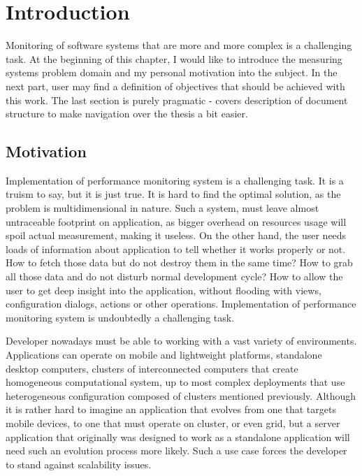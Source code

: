 %
\chapter{Introduction}
\label{cha:intro}


\parbox{0.8\textwidth}{

{\small
Monitoring of software systems that are more and more complex is a challenging task. At the beginning of this chapter, I would like to introduce the measuring systems problem domain and my personal motivation into the subject. In the next part, user may find a definition of objectives that should be achieved with this work. The last section is purely pragmatic - covers description of document structure to make navigation over the thesis a bit easier.
}
}

\section{Motivation}
\label{ch1:Motivation}

Implementation of performance monitoring system is a challenging task. It is a truism to say, but it is just true. It is hard to find the optimal solution, as the problem is multidimensional in nature. Such a system, must leave almost untraceable footprint on application, as bigger overhead on resources usage will spoil actual measurement, making it useless. On the other hand, the user needs loads of information about application to tell whether it works properly or not. How to fetch those data but do not destroy them in the same time? How to grab all those data and do not disturb normal development cycle? How to allow the user to get deep insight into the application, without flooding with views, configuration dialogs, actions or other operations. Implementation of performance monitoring system is undoubtedly a challenging task.

Developer nowadays must be able to working with a vast variety of environments. Applications can operate on mobile and lightweight platforms, standalone desktop computers, clusters of interconnected computers that create homogeneous computational system, up to most complex deployments that use heterogeneous configuration composed of clusters mentioned previously. Although it is rather hard to imagine an application that evolves from one that targets mobile devices, to one that must operate on cluster, or even grid, but a server application that originally was designed to work as a standalone application will need such an evolution process more likely. Such a use case forces the developer to stand against scalability issues.

